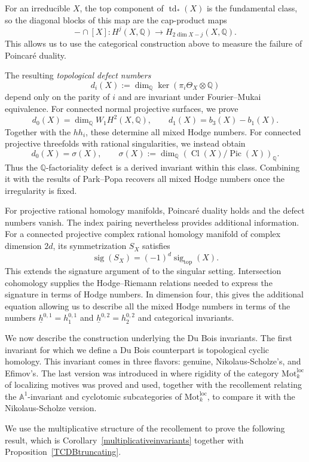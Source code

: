 \documentclass{amsart}
\theoremstyle{plain}
\theoremstyle{definition}
\newcommand{\bbA}{\mathbb{A}}
\newcommand{\bbQ}{\mathbb{Q}}
\newcommand{\Motloc}{\mathrm{Mot}^{\mathrm{loc}}}
\DeclareMathOperator{\td}{td}
\DeclareMathOperator{\sig}{sig}
\DeclareMathOperator{\Cl}{Cl}
\DeclareMathOperator{\Pic}{Pic}
\begin{document}
For an irreducible $X$, the top component of $\td_*(X)$ is the fundamental class, so the diagonal blocks of this map are the cap-product maps
\[
-\cap[X]:H^j(X,\bbQ)\longrightarrow H_{2\dim X-j}(X,\bbQ).
\]
This allows us to use the categorical construction above to measure the failure of Poincar\'e duality.

The resulting \emph{topological defect numbers}
\[
d_i(X):=
\dim_{\bbQ}\ker(\pi_i\Theta_X\otimes\bbQ)
\]
depend only on the parity of $i$ and are invariant under Fourier--Mukai equivalence. For connected normal projective surfaces, we prove
\[
d_0(X)=\dim_{\bbQ}W_1H^2(X,\bbQ),
\qquad
d_1(X)=b_3(X)-b_1(X).
\]
Together with the $hh_i$, these determine all mixed Hodge numbers. For connected projective threefolds with rational singularities, we instead obtain
\[
d_0(X)=\sigma(X),
\qquad
\sigma(X):=
\dim_{\bbQ}(\Cl(X)/\Pic(X))_{\bbQ}.
\]
Thus the $\bbQ$-factoriality defect is a derived invariant within this class. Combining it with the results of Park--Popa \cite{PP25a,PP25b} recovers all mixed Hodge numbers once the irregularity is fixed.

For projective rational homology manifolds, Poincar\'e duality holds and the defect numbers vanish. The index pairing nevertheless provides additional information.
For a connected projective complex rational homology manifold of complex dimension $2d$, its symmetrization
$S_X$ satisfies
\[
\sig(S_X)=(-1)^d\sig_{\mathrm{top}}(X).
\]
This extends the signature argument of \cite{Ant26}
to the singular setting. Intersection cohomology supplies the Hodge--Riemann relations needed to express the signature in terms of Hodge numbers. In dimension four, this gives the additional equation allowing us to describe all the mixed Hodge numbers in terms of the numbers $\underline{h}^{0,1}=h^{0,1}_1$ and $\underline{h}^{0,2}=h^{0,2}_2$ and categorical invariants.

\medskip

We now describe the construction underlying the Du Bois invariants. The first invariant for which we define a Du Bois counterpart is topological cyclic homology. This invariant comes in three flavors: genuine, Nikolaus-Scholze's, and Efimov's. The last version was introduced in \cite{Efi25b} where rigidity of the category $\Motloc_k$ of localizing motives was proved and used, together with the recollement relating the $\bbA^1$-invariant and cyclotomic subcategories of $\Motloc_k$, to compare it with the Nikolaus-Scholze version.

We use the multiplicative structure of the recollement to prove the following result, which is Corollary~\ref{multiplicativeinvariants}
together with Proposition~\ref{TCDBtruncating}.
\end{document}

